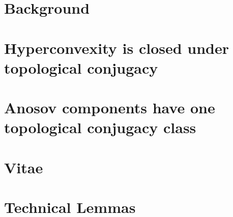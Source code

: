 \documentclass[12pt,reqno,oneside]{amsbook}
\begin{document}


\chapter{Background}



\chapter{Hyperconvexity is closed under topological conjugacy}



\chapter{Anosov components have one topological conjugacy class}



\chapter{Vitae}



\appendix
\chapter{Technical Lemmas}



\backmatter 
\singlespacing


\end{document}
